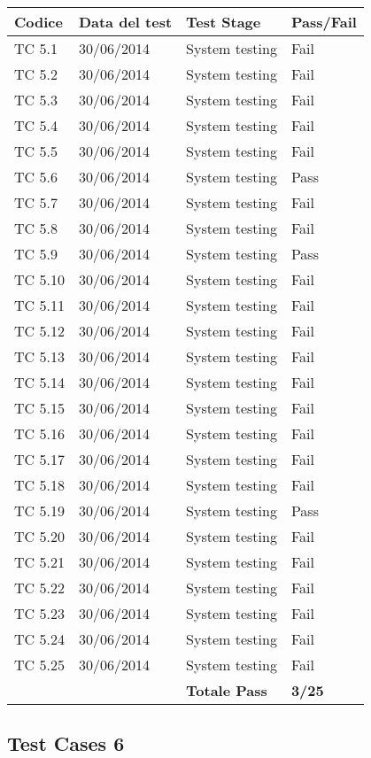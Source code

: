 \begin{tabular}{|p{3cm}|p{3cm}|p{3cm}|p{3cm}|}
	\hline
	\rowcolor{Gray}
	\textbf{Codice} & \textbf{Data del test} & \textbf{Test Stage} & \textbf{Pass/Fail}\tabularnewline
	\hline
	TC 5.1			& 30/06/2014 			& System testing		& Fail \tabularnewline
	\hline
	TC 5.2			& 30/06/2014 			& System testing		& Fail \tabularnewline
	\hline
	TC 5.3			& 30/06/2014 			& System testing		& Fail \tabularnewline
	\hline
	TC 5.4			& 30/06/2014 			& System testing		& Fail \tabularnewline
	\hline
	TC 5.5			& 30/06/2014 			& System testing		& Fail \tabularnewline
	\hline
	TC 5.6			& 30/06/2014 			& System testing		& Pass \tabularnewline
	\hline
	TC 5.7			& 30/06/2014 			& System testing		& Fail \tabularnewline
	\hline
	TC 5.8			& 30/06/2014 			& System testing		& Fail \tabularnewline
	\hline
	TC 5.9			& 30/06/2014 			& System testing		& Pass \tabularnewline
	\hline
	TC 5.10			& 30/06/2014 			& System testing		& Fail \tabularnewline
	\hline
	TC 5.11			& 30/06/2014 			& System testing		& Fail \tabularnewline
	\hline
	TC 5.12			& 30/06/2014 			& System testing		& Fail \tabularnewline
	\hline
	TC 5.13			& 30/06/2014 			& System testing		& Fail \tabularnewline
	\hline
	TC 5.14			& 30/06/2014 			& System testing		& Fail \tabularnewline
	\hline
	TC 5.15			& 30/06/2014 			& System testing		& Fail \tabularnewline
	\hline
	TC 5.16			& 30/06/2014 			& System testing		& Fail \tabularnewline
	\hline
	TC 5.17			& 30/06/2014 			& System testing		& Fail \tabularnewline
	\hline
	TC 5.18			& 30/06/2014 			& System testing		& Fail \tabularnewline
	\hline
	TC 5.19			& 30/06/2014 			& System testing		& Pass \tabularnewline
	\hline
	TC 5.20			& 30/06/2014 			& System testing		& Fail \tabularnewline
	\hline
	TC 5.21			& 30/06/2014 			& System testing		& Fail \tabularnewline
	\hline
	TC 5.22			& 30/06/2014 			& System testing		& Fail \tabularnewline
	\hline
	TC 5.23			& 30/06/2014 			& System testing		& Fail \tabularnewline
	\hline
	TC 5.24			& 30/06/2014 			& System testing		& Fail \tabularnewline
	\hline
	TC 5.25			& 30/06/2014 			& System testing		& Fail \tabularnewline
	\hline
					& 						& \textbf{Totale Pass}	& \textbf{3/25} \tabularnewline
	\hline
\end{tabular}

\subsection{Test Cases 6}

